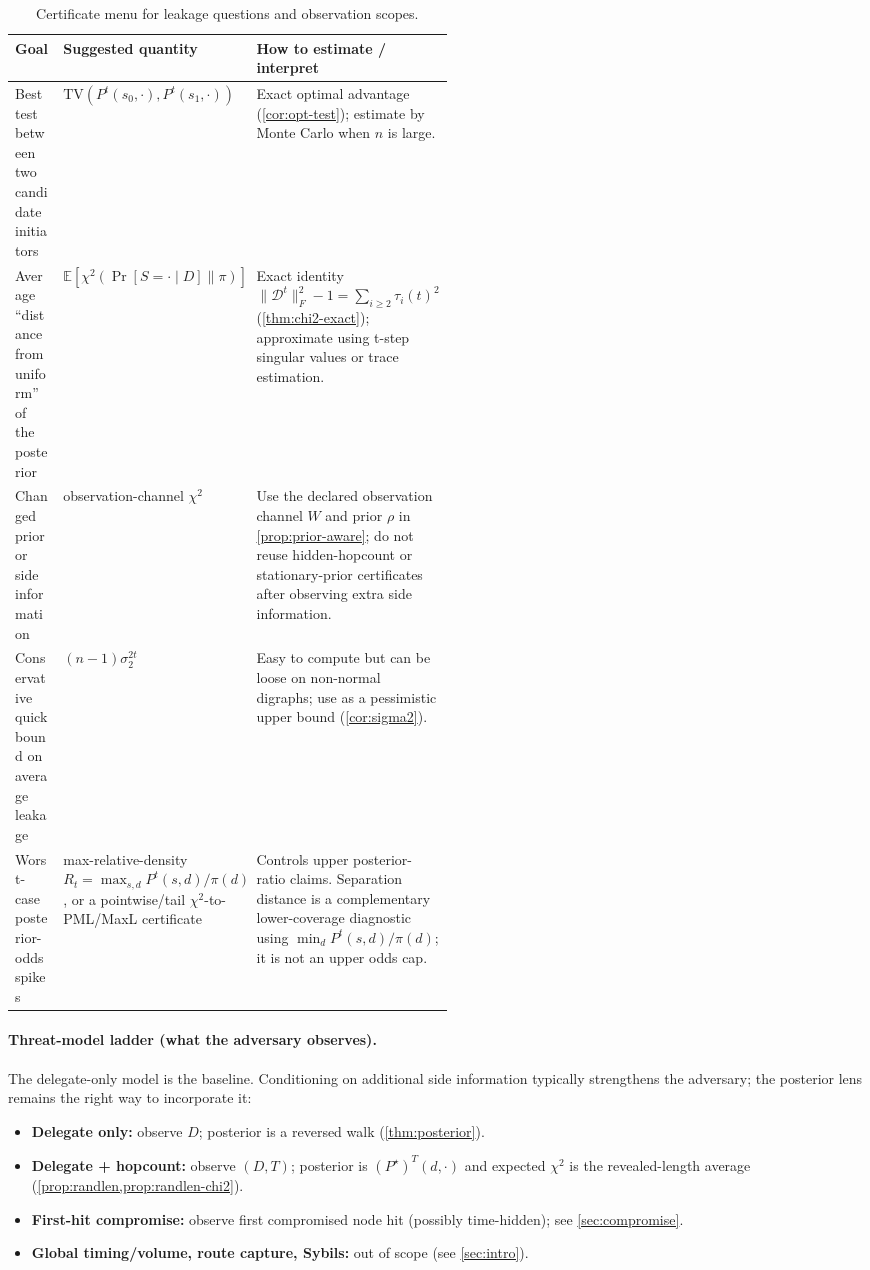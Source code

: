 \documentclass[11pt]{article}
\newcommand{\TV}{\mathrm{TV}}
\newcommand{\E}{\mathbb{E}}
\newcommand{\cD}{\mathcal{D}}
\begin{document}
\begin{table}[h]
\centering
\small
\setlength{\tabcolsep}{4pt}
\renewcommand{\arraystretch}{1.15}
\begin{tabularx}{\linewidth}{>{\raggedright\arraybackslash}p{0.24\linewidth}>{\raggedright\arraybackslash}p{0.27\linewidth}>{\raggedright\arraybackslash}X}
\toprule
Goal & Suggested quantity & How to estimate / interpret \\
\midrule
Best test between two candidate initiators
& $\TV(P^t(s_0,\cdot),P^t(s_1,\cdot))$
& Exact optimal advantage (\cref{cor:opt-test}); estimate by Monte Carlo when $n$ is large. \\
Average ``distance from uniform'' of the posterior
& $\E[\chi^2(\Pr[S=\cdot\mid D]\|\pi)]$
& Exact identity $\|\cD^t\|_F^2-1=\sum_{i\ge 2}\tau_i(t)^2$ (\cref{thm:chi2-exact}); approximate using t-step singular values or trace estimation. \\
Changed prior or side information
& observation-channel $\chi^2$
& Use the declared observation channel $W$ and prior $\rho$ in \cref{prop:prior-aware}; do not reuse hidden-hopcount or stationary-prior certificates after observing extra side information. \\
Conservative quick bound on average leakage
& $(n-1)\sigma_2^{2t}$
& Easy to compute but can be loose on non-normal digraphs; use as a pessimistic upper bound (\cref{cor:sigma2}). \\
Worst-case posterior-odds spikes
& max-relative-density $R_t=\max_{s,d}P^t(s,d)/\pi(d)$, or a pointwise/tail $\chi^2$-to-PML/MaxL certificate
& Controls upper posterior-ratio claims.  Separation distance is a complementary lower-coverage diagnostic using $\min_d P^t(s,d)/\pi(d)$; it is not an upper odds cap. \\
\bottomrule
\end{tabularx}
\caption{Certificate menu for leakage questions and observation scopes.}
\label{tab:menu}
\end{table}

\paragraph{Threat-model ladder (what the adversary observes).}
The delegate-only model is the baseline. Conditioning on additional side
information typically strengthens the adversary; the posterior lens remains the
right way to incorporate it:
\begin{itemize}[leftmargin=1.2em]
\item \textbf{Delegate only:} observe $D$; posterior is a reversed walk (\cref{thm:posterior}).
\item \textbf{Delegate + hopcount:} observe $(D,T)$; posterior is $(P^\star)^T(d,\cdot)$ and expected $\chi^2$ is the revealed-length average (\cref{prop:randlen,prop:randlen-chi2}).
\item \textbf{First-hit compromise:} observe first compromised node hit (possibly time-hidden); see \cref{sec:compromise}.
\item \textbf{Global timing/volume, route capture, Sybils:} out of scope (see \cref{sec:intro}).
\end{itemize}
\end{document}
